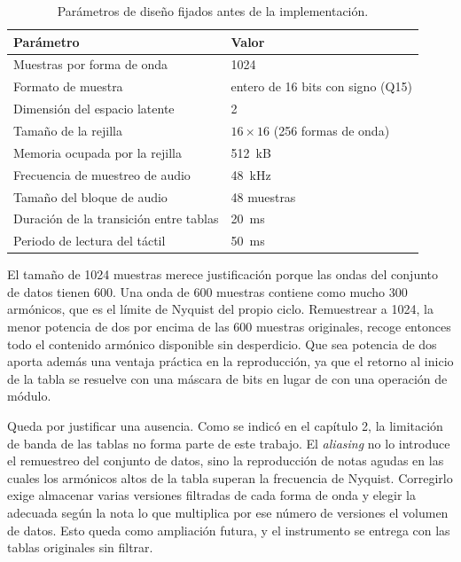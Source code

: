 \begin{table}[htbp]
    \centering
    \caption{Parámetros de diseño fijados antes de la implementación.}
    \label{tab:parametros}
    \begin{tabular}{ll}
        \toprule
        \textbf{Parámetro} & \textbf{Valor} \\
        \midrule
        Muestras por forma de onda & 1024 \\
        Formato de muestra & entero de 16 bits con signo (Q15) \\
        Dimensión del espacio latente & 2 \\
        Tamaño de la rejilla & $16 \times 16$ (256 formas de onda) \\
        Memoria ocupada por la rejilla & 512~kB \\
        Frecuencia de muestreo de audio & 48~kHz \\
        Tamaño del bloque de audio & 48 muestras \\
        Duración de la transición entre tablas & 20~ms \\
        Periodo de lectura del táctil & 50~ms \\
        \bottomrule
    \end{tabular}
\end{table}

El tamaño de 1024 muestras merece justificación porque las ondas del conjunto de datos
tienen 600. Una onda de 600 muestras contiene como mucho 300 armónicos, que es
el límite de Nyquist del propio ciclo. Remuestrear a 1024, la menor potencia de dos por 
encima de las 600 muestras originales, recoge entonces todo el contenido
armónico disponible sin desperdicio. Que sea potencia de dos aporta además una ventaja
práctica en la reproducción, ya que el retorno al inicio de la tabla se resuelve
con una máscara de bits en lugar de con una operación de módulo.

Queda por justificar una ausencia. Como se indicó en el capítulo 2, la
limitación de banda de las tablas no forma parte de este trabajo. El
\emph{aliasing} no lo introduce el remuestreo del conjunto de datos, sino la reproducción de notas agudas 
en las cuales los armónicos altos de la tabla superan la frecuencia de Nyquist. Corregirlo exige almacenar varias
versiones filtradas de cada forma de onda y elegir la adecuada según la nota lo
que multiplica por ese número de versiones el volumen de datos. Esto queda 
como ampliación futura, y el instrumento se entrega con las tablas originales sin filtrar.

